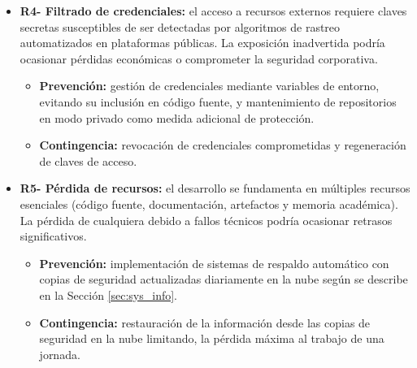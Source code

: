 \begin{itemize}
  \item\textbf{R4- Filtrado de credenciales: }el acceso a recursos externos requiere claves secretas susceptibles de ser detectadas por algoritmos de rastreo automatizados en plataformas públicas. La exposición inadvertida podría ocasionar pérdidas económicas o comprometer la seguridad corporativa.
  \begin{itemize}
    \item \textbf{Prevención: }gestión de credenciales mediante variables de entorno, evitando su inclusión en código fuente, y mantenimiento de repositorios en modo privado como medida adicional de protección.
    \item \textbf{Contingencia: }revocación de credenciales comprometidas y regeneración de claves de acceso.
  \end{itemize}
  
  \item\textbf{R5- Pérdida de recursos: }el desarrollo se fundamenta en múltiples recursos esenciales (código fuente, documentación, artefactos y memoria académica). La pérdida de cualquiera debido a fallos técnicos podría ocasionar retrasos significativos.
  \begin{itemize}
    \item \textbf{Prevención: }implementación de sistemas de respaldo automático con copias de seguridad actualizadas diariamente en la nube según se describe en la Sección \ref{sec:sys_info}.
\item \textbf{Contingencia: }restauración de la información desde las copias de seguridad en la nube limitando, la pérdida máxima al trabajo de una jornada.
  \end{itemize}
\end{itemize}

